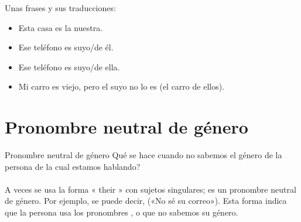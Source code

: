 Unas frases y sus traducciones:
\begin{itemize}
	\item Esta casa es la nuestra.
		\arr {}
	\item Ese tel\'efono es suyo/de \'el.
		\arr {}
	\item Ese tel\'efono es suyo/de ella.
		\arr {}
	\item Mi carro es viejo, pero el suyo no lo es (el carro de ellos).
		\arr {}
\end{itemize}

\section{Pronombre neutral de g\'enero}
\begin{conf}{Pronombre neutral de g\'enero}
\textquestiondown Qu\'e se hace cuando no sabemos el g\'enero de la persona de
la cual estamos hablando? \\
\\
A veces se usa la forma « their » con sujetos singulares; es un pronombre neutral
de g\'enero.
Por ejemplo, se puede decir,  («No sé su correo»).
Esta forma indica que la persona usa los pronombres , o que
no sabemos su g\'enero.
\end{conf}

